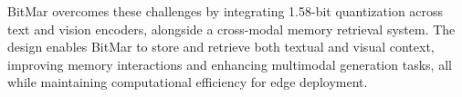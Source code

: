 BitMar overcomes these challenges by integrating 1.58-bit quantization across text and vision encoders, alongside a cross-modal memory retrieval system. The design enables BitMar to store and retrieve both textual and visual context, improving memory interactions and enhancing multimodal generation tasks, all while maintaining computational efficiency for edge deployment.
